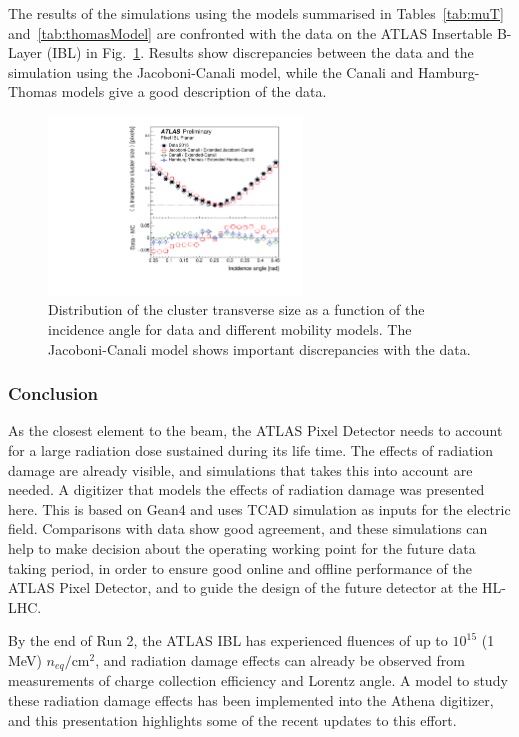 \clearpage
\noindent
The results of the simulations using the models summarised in Tables~\ref{tab:muT} and~\ref{tab:thomasModel} are confronted with the data on the ATLAS Insertable B-Layer (IBL) in Fig.~\ref{fig:muLorentz}. Results show discrepancies between the data and the simulation using the Jacoboni-Canali model, while the Canali and Hamburg-Thomas models give a good description of the data. 
\begin{figure}[H]
\centering
\includegraphics[width=0.6\textwidth]{figures/SensorSimulation/lorentz_279169_eta0.pdf}
\caption{Distribution of the cluster transverse size as a function of the incidence angle for data and different mobility models. The Jacoboni-Canali model shows important discrepancies with the data.}
\label{fig:muLorentz}
\end{figure}




\subsubsection{Conclusion}
As the closest element to the beam, the ATLAS Pixel Detector needs to account for a large radiation dose sustained during its life time. The effects of radiation damage are already visible, and simulations that takes this into account are needed. A digitizer that models the effects of radiation damage was presented here. This is based on Gean4 and uses TCAD simulation as inputs for the electric field. Comparisons with data show good agreement, and these simulations can help to make decision about the operating working point for the future data taking period, in order to ensure good online and offline performance of the ATLAS Pixel Detector, and to guide the design of the future detector at the HL-LHC.



By the end of Run 2, the ATLAS IBL has experienced fluences of up to $10^{15}$ (1 MeV) $n_{eq}/$cm$^{2}$, and radiation damage effects can already be observed from measurements of charge collection efficiency and Lorentz angle\cite{Aaboud_2019}. A model to study these radiation damage effects has been implemented into the Athena digitizer, and this presentation highlights some of the recent updates to this effort.

